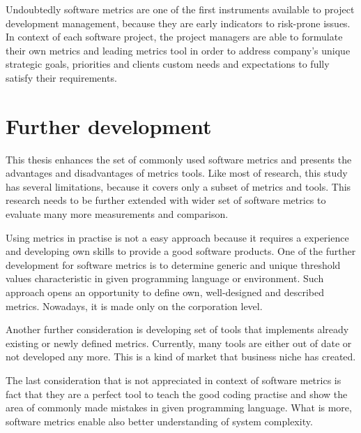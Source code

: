 Undoubtedly software metrics are one of the first instruments available to project development management, because they are early indicators to risk-prone issues. In context of each software project, the project managers are able to formulate their own metrics and leading metrics tool in order to address company's unique strategic goals, priorities and clients custom needs and expectations to fully satisfy their requirements. 

\section{Further development}
This thesis enhances the set of commonly used software metrics and presents the advantages and disadvantages of metrics tools. Like most of research, this study has several limitations, because it covers only a subset of metrics and tools. This research needs to be further extended with wider set of software metrics to evaluate many more measurements and comparison.

Using metrics in practise is not a easy approach because it requires a experience and developing own skills to provide a good software products. One of the further development for software metrics  is to determine generic and unique threshold values characteristic in given programming language or environment. Such approach opens an opportunity to define own, well-designed and described metrics. Nowadays, it is made only on the corporation level.

Another further consideration is developing set of tools that implements already existing or newly defined metrics. Currently, many tools are either out of date or not developed any more. This is a kind of market that business niche has created.   

The last consideration that is not appreciated in context of software metrics is fact that they are a perfect tool to teach the good coding practise and show the area of commonly made mistakes in given programming language. What is more, software metrics enable also better understanding of system complexity. 